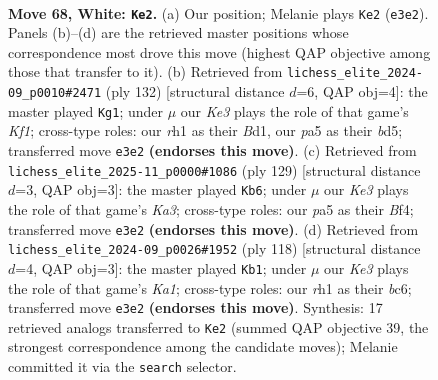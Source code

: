 \documentclass[11pt]{article}
\begin{document}
\clearpage

\begin{figure}[p]\centering
\begin{subfigure}{0.46\textwidth}\centering
\resizebox{\linewidth}{!}{%
\newchessgame
\chessboard[
  setfen={8/3k4/2p5/p2p4/8/4K3/8/7r w - - 6 68},
  showmover=false,
  pgfstyle=straightmove, color=movearrow, markmove={e3-e2}
]}
\caption{}
\end{subfigure}\hfill
\begin{subfigure}{0.46\textwidth}\centering
\resizebox{\linewidth}{!}{%
\newchessgame
\chessboard[
  setfen={8/8/8/3b2k1/5p2/6p1/8/3B1K2 w - - 4 67},
  showmover=false,
  pgfstyle=straightmove, color=movearrow, markmove={f1-g1}
]}
\caption{}
\end{subfigure}
\\[4pt]
\begin{subfigure}{0.46\textwidth}\centering
\resizebox{\linewidth}{!}{%
\newchessgame
\chessboard[
  setfen={6R1/8/k7/8/P4b2/1PK5/8/8 b - - 3 65},
  showmover=false,
  pgfstyle=straightmove, color=movearrow, markmove={a6-b6}
]}
\caption{}
\end{subfigure}\hfill
\begin{subfigure}{0.46\textwidth}\centering
\resizebox{\linewidth}{!}{%
\newchessgame
\chessboard[
  setfen={8/8/2b5/8/1pk5/p7/8/K7 w - - 0 60},
  showmover=false,
  pgfstyle=straightmove, color=movearrow, markmove={a1-b1}
]}
\caption{}
\end{subfigure}
\caption{\textbf{Move 68, White: \texttt{Ke2}.} (a) Our position; Melanie plays \texttt{Ke2} (\texttt{e3e2}). Panels (b)--(d) are the retrieved master positions whose correspondence most drove this move (highest QAP objective among those that transfer to it). (b) Retrieved from \texttt{lichess\_elite\_2024-09\_p0010\#2471} (ply 132) [structural distance $d$=6, QAP obj=4]: the master played \texttt{Kg1}; under $\mu$ our \emph{Ke3} plays the role of that game's \emph{Kf1}; cross-type roles: our \emph{r}h1 as their \emph{B}d1, our \emph{p}a5 as their \emph{b}d5; transferred move \texttt{e3e2} \textbf{(endorses this move)}. (c) Retrieved from \texttt{lichess\_elite\_2025-11\_p0000\#1086} (ply 129) [structural distance $d$=3, QAP obj=3]: the master played \texttt{Kb6}; under $\mu$ our \emph{Ke3} plays the role of that game's \emph{Ka3}; cross-type roles: our \emph{p}a5 as their \emph{B}f4; transferred move \texttt{e3e2} \textbf{(endorses this move)}. (d) Retrieved from \texttt{lichess\_elite\_2024-09\_p0026\#1952} (ply 118) [structural distance $d$=4, QAP obj=3]: the master played \texttt{Kb1}; under $\mu$ our \emph{Ke3} plays the role of that game's \emph{Ka1}; cross-type roles: our \emph{r}h1 as their \emph{b}c6; transferred move \texttt{e3e2} \textbf{(endorses this move)}. Synthesis: 17 retrieved analogs transferred to \texttt{Ke2} (summed QAP objective 39, the strongest correspondence among the candidate moves); Melanie committed it via the \texttt{search} selector.}
\label{fig:thought-m134}
\end{figure}
\end{document}
